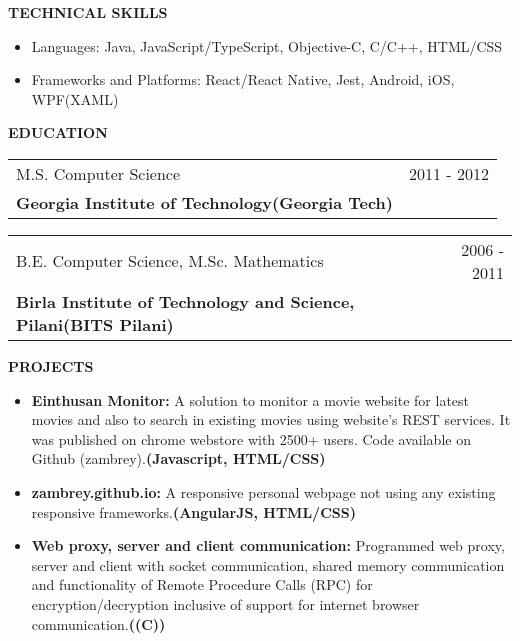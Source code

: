\documentclass[a4paper]{article}
\makeatletter
\newcommand{\resumesection}[1]{
	\vspace*{-0.5\baselineskip}
	\begin{flushleft}
		\large{\textbf{\uppercase{#1}}}
	\end{flushleft}
} %
\newcommand{\educationsubsection}[4]{
	\begin{tabular*}{1.0\textwidth}{@{\extracolsep{\fill}} l r}
		#1 & #2 \\
		\textbf{#3} & #4\\
	\end{tabular*}
} %
\newcommand{\project}[3]{\item \textbf{#1:} #2\textbf{(#3)}} %
\newcommand{\customitemizespacing}{\addtolength{\itemsep}{-0.5\baselineskip}}
\makeatother
\begin{document}
\resumesection{Technical Skills}
\begin{itemize}
	\item Languages: Java, JavaScript/TypeScript, Objective-C, C/C++, HTML/CSS
	\item Frameworks and Platforms: React/React Native, Jest, Android, iOS, WPF(XAML)
\end{itemize}

\resumesection{Education}
\educationsubsection{M.S. Computer Science}{2011 - 2012}{Georgia Institute of Technology(Georgia Tech)}{}
\newline
\educationsubsection{B.E. Computer Science, M.Sc. Mathematics}{2006 - 2011}{Birla Institute of Technology and Science, Pilani(BITS Pilani)}{}

\resumesection{Projects}
\begin{itemize}
	\project{Einthusan Monitor}{A solution to monitor a movie website for latest movies and also to search in existing movies using website's REST services. It was published on chrome webstore with 2500+ users. Code available on Github (zambrey).}{Javascript, HTML/CSS}
	\project{zambrey.github.io}{A responsive personal webpage not using any existing responsive frameworks.}{AngularJS, HTML/CSS}
	\project{Web proxy, server and client communication}{Programmed web proxy, server and client with socket communication, shared memory communication and functionality of Remote Procedure Calls (RPC) for encryption/decryption inclusive of support for internet browser communication.}{(C)}
\end{itemize}
\end{document}
